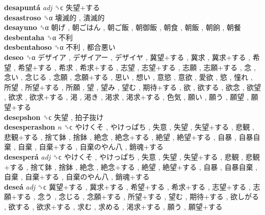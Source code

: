 \textbf{desapuntá} \emph{adj}  ␝ϲ   失望+する   \\
\textbf{desastroso} ␝α   壊滅的 ,  潰滅的   \\
\textbf{desayuno} ␝α   朝げ ,  朝ごはん ,  朝ご飯 ,  朝御飯 ,  朝食 ,  朝飯 ,  朝餉 ,  朝餐   \\
\textbf{desbentaha} ␝α   不利   \\
\textbf{desbentahoso} ␝α   不利 ,  都合悪い   \\
\textbf{deseo} ␝α   デザイア ,  デザイアー ,  デザイヤ ,  冀望+する ,  冀求 ,  冀求+する ,  希望 ,  希望+する ,  希求 ,  希求+する ,  志望 ,  志望+する ,  志願 ,  志願+する ,  念 ,  念い ,  念じる ,  念願 ,  念願+する ,  思い ,  想い ,  意慾 ,  意欲 ,  愛欲 ,  慾 ,  憧れ ,  所望 ,  所望+する ,  所願 ,  望 ,  望み ,  望む ,  期待+する ,  欲 ,  欲する ,  欲念 ,  欲望 ,  欲求 ,  欲求+する ,  渇 ,  渇き ,  渇求 ,  渇求+する ,  色気 ,  願い ,  願う ,  願望 ,  願望+する   \\
\textbf{desepshon} ␝ϲ   失望 ,  拍子抜け   \\
\textbf{desesperashon} \emph{n}  ␝ϲ   やけくそ ,  やけっぱち ,  失意 ,  失望 ,  失望+する ,  悲観 ,  悲観+する ,  捨て鉢 ,  捨鉢 ,  絶念 ,  絶念+する ,  絶望 ,  絶望+する ,  自暴 ,  自暴自棄 ,  自棄 ,  自棄+する ,  自棄のやん八 ,  銷魂+する   \\
\textbf{desesperá} \emph{adj}  ␝ϲ   やけくそ ,  やけっぱち ,  失意 ,  失望 ,  失望+する ,  悲観 ,  悲観+する ,  捨て鉢 ,  捨鉢 ,  絶念 ,  絶念+する ,  絶望 ,  絶望+する ,  自暴 ,  自暴自棄 ,  自棄 ,  自棄+する ,  自棄のやん八 ,  銷魂+する   \\
\textbf{deseá} \emph{adj}  ␝ϲ   冀望+する ,  冀求+する ,  希望+する ,  希求+する ,  志望+する ,  志願+する ,  念う ,  念じる ,  念願+する ,  所望+する ,  望む ,  期待+する ,  欲しがる ,  欲する ,  欲求+する ,  求む ,  求める ,  渇求+する ,  願う ,  願望+する   \\
